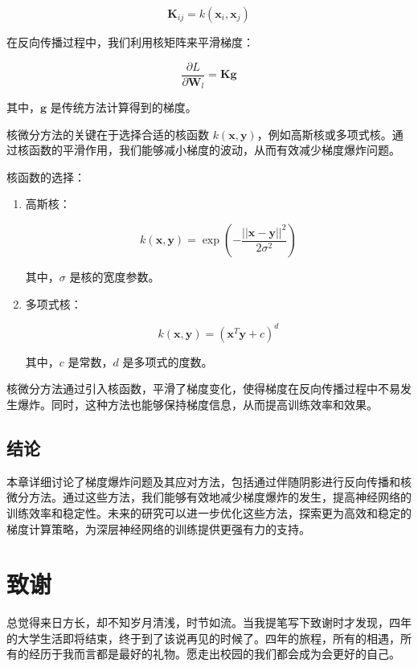 \documentclass[12pt,a4paper]{amsart}
\begin{document}
\[ \mathbf{K}_{ij} = k(\mathbf{x}_i, \mathbf{x}_j) \]

在反向传播过程中，我们利用核矩阵来平滑梯度：

\[ \frac{\partial L}{\partial \mathbf{W}_l} = \mathbf{K} \mathbf{g} \]

其中，\(\mathbf{g}\) 是传统方法计算得到的梯度。

核微分方法的关键在于选择合适的核函数 \(k(\mathbf{x}, \mathbf{y})\)，例如高斯核或多项式核。通过核函数的平滑作用，我们能够减小梯度的波动，从而有效减少梯度爆炸问题。

核函数的选择：

\begin{enumerate}

\item 高斯核：

\[ k(\mathbf{x}, \mathbf{y}) = \exp\left(-\frac{||\mathbf{x} - \mathbf{y}||^2}{2\sigma^2}\right) \]

其中，\(\sigma\) 是核的宽度参数。

\item 多项式核：

\[ k(\mathbf{x}, \mathbf{y}) = (\mathbf{x}^T \mathbf{y} + c)^d \]

其中，\(c\) 是常数，\(d\) 是多项式的度数。

\end{enumerate}

核微分方法通过引入核函数，平滑了梯度变化，使得梯度在反向传播过程中不易发生爆炸。同时，这种方法也能够保持梯度信息，从而提高训练效率和效果。

\subsection{结论}

本章详细讨论了梯度爆炸问题及其应对方法，包括通过伴随阴影进行反向传播和核微分方法。通过这些方法，我们能够有效地减少梯度爆炸的发生，提高神经网络的训练效率和稳定性。未来的研究可以进一步优化这些方法，探索更为高效和稳定的梯度计算策略，为深层神经网络的训练提供更强有力的支持。

\section{致谢}

总觉得来日方长，却不知岁月清浅，时节如流。当我提笔写下致谢时才发现，四年的大学生活即将结束，终于到了该说再见的时候了。四年的旅程，所有的相遇，所有的经历于我而言都是最好的礼物。愿走出校园的我们都会成为会更好的自己。
\end{document}
